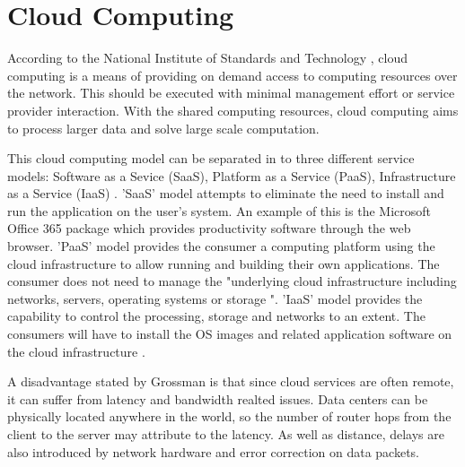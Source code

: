 \section{Cloud Computing}
According to the National Institute of Standards and Technology \cite{mell2011nist}, cloud computing is a means of providing on demand access to computing resources over the network. This should be executed with minimal management effort or service provider interaction. With the shared computing resources, cloud computing aims to process larger data and solve large scale computation.
\newline
\par
This cloud computing model can be separated in to three different service models: Software as a Sevice (SaaS), Platform as a Service (PaaS), Infrastructure as a Service (IaaS) \cite{jadeja2012cloud}. 'SaaS' model attempts to eliminate the need to install and run the application on the user's system. An example of this is the Microsoft Office 365 package which provides productivity software through the web browser. 'PaaS' model provides the consumer a computing platform using the cloud infrastructure to allow running and building their own applications. The consumer does not need to manage the "underlying cloud infrastructure including networks, servers, operating systems or storage \cite{mell2011nist}". 'IaaS' model provides the capability to control the processing, storage and networks to an extent. The consumers will have to install the OS images and related application software on the cloud infrastructure \cite{cloudservices}.
\newline
\par
A disadvantage stated by Grossman \cite{grossman2009case} is that since cloud services are often remote, it can suffer from latency and bandwidth realted issues. Data centers can be physically located anywhere in the world, so the number of router hops from the client to the server may attribute to the latency. As well as distance, delays are also introduced by network hardware and error correction on data packets.

